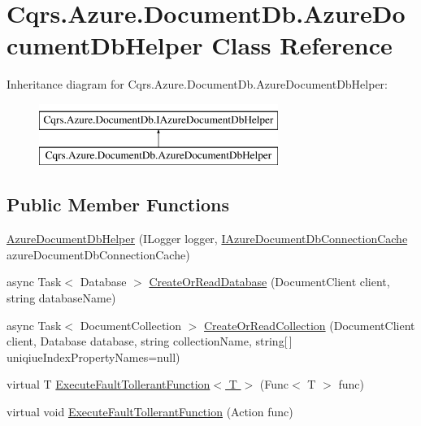 \hypertarget{classCqrs_1_1Azure_1_1DocumentDb_1_1AzureDocumentDbHelper}{}\section{Cqrs.\+Azure.\+Document\+Db.\+Azure\+Document\+Db\+Helper Class Reference}
\label{classCqrs_1_1Azure_1_1DocumentDb_1_1AzureDocumentDbHelper}
Inheritance diagram for Cqrs.\+Azure.\+Document\+Db.\+Azure\+Document\+Db\+Helper\+:\begin{figure}[H]
\begin{center}
\leavevmode
\includegraphics[height=2.000000cm]{classCqrs_1_1Azure_1_1DocumentDb_1_1AzureDocumentDbHelper}
\end{center}
\end{figure}
\subsection*{Public Member Functions}
\begin{DoxyCompactItemize}
\item 
\hyperlink{classCqrs_1_1Azure_1_1DocumentDb_1_1AzureDocumentDbHelper_af6557961f9bfc7685a1197d5fd40a35e_af6557961f9bfc7685a1197d5fd40a35e}{Azure\+Document\+Db\+Helper} (I\+Logger logger, \hyperlink{interfaceCqrs_1_1Azure_1_1DocumentDb_1_1IAzureDocumentDbConnectionCache}{I\+Azure\+Document\+Db\+Connection\+Cache} azure\+Document\+Db\+Connection\+Cache)
\item 
async Task$<$ Database $>$ \hyperlink{classCqrs_1_1Azure_1_1DocumentDb_1_1AzureDocumentDbHelper_ad16ab0ecb4524057ddb2f8e67043179f_ad16ab0ecb4524057ddb2f8e67043179f}{Create\+Or\+Read\+Database} (Document\+Client client, string database\+Name)
\item 
async Task$<$ Document\+Collection $>$ \hyperlink{classCqrs_1_1Azure_1_1DocumentDb_1_1AzureDocumentDbHelper_a5dd4b71b321017034c3d5c651017a068_a5dd4b71b321017034c3d5c651017a068}{Create\+Or\+Read\+Collection} (Document\+Client client, Database database, string collection\+Name, string\mbox{[}$\,$\mbox{]} uniqiue\+Index\+Property\+Names=null)
\item 
virtual T \hyperlink{classCqrs_1_1Azure_1_1DocumentDb_1_1AzureDocumentDbHelper_a470fcc86befa4a28725ad53e715a223c_a470fcc86befa4a28725ad53e715a223c}{Execute\+Fault\+Tollerant\+Function$<$ T $>$} (Func$<$ T $>$ func)
\item 
virtual void \hyperlink{classCqrs_1_1Azure_1_1DocumentDb_1_1AzureDocumentDbHelper_a334337444ff416c9f4ce48ec61e60a83_a334337444ff416c9f4ce48ec61e60a83}{Execute\+Fault\+Tollerant\+Function} (Action func)
\end{DoxyCompactItemize}
